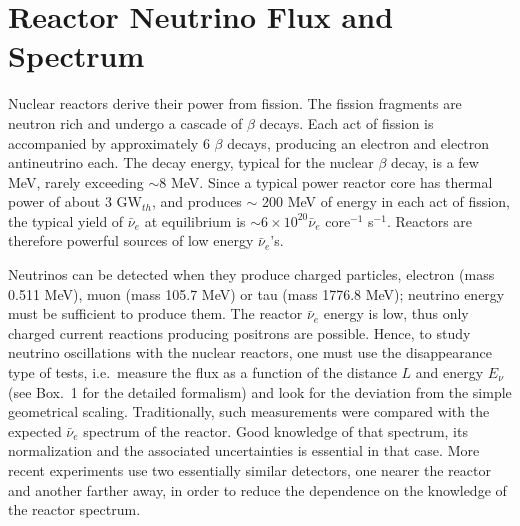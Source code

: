 \documentclass[aps,twocolumn,preprintnumbers,amsmath,superscriptaddress,amssymb,floats,nofootinbib]{revtex4-1}
\begin{document}
\section{Reactor Neutrino Flux and Spectrum} 
\label{sec:flux}

Nuclear reactors derive their power from fission. The fission fragments are neutron rich and undergo a cascade of $\beta$ decays. Each act of fission
is accompanied by approximately 6 $\beta$ decays, producing an electron and electron antineutrino each. The decay energy, typical for the nuclear
$\beta$ decay, is a few MeV, rarely exceeding $\sim$8 MeV. Since a typical power reactor core has thermal power of about 3 GW$_{th}$, and produces
$\sim$ 200 MeV of energy in each act of fission, the typical yield of $\bar{\nu}_e$ at equilibrium is $\sim 6 \times 10^{20} \bar{\nu}_e$ core$^{-1}$ s$^{-1}$.   
Reactors are therefore powerful sources of low energy $\bar{\nu}_e$'s.

Neutrinos can be detected when they produce charged particles, electron (mass 0.511 MeV),
muon (mass 105.7 MeV) or tau (mass 1776.8 MeV); neutrino energy must be sufficient to
produce them. The reactor $\bar{\nu}_e$ energy is low, thus only charged current reactions producing positrons are possible. Hence, to study neutrino oscillations with
the nuclear reactors, one must use the disappearance type of tests, i.e.~measure the flux as a function of the distance $L$ and energy $E_{\nu}$ (see Box.~1 for the detailed formalism) and
look for the deviation from the simple geometrical scaling. Traditionally, such measurements were compared with the expected  $\bar{\nu}_e$ spectrum
of the reactor. Good knowledge of that spectrum, its normalization and the associated uncertainties is essential in that case.  More recent experiments
\cite{Dayabay,Reno} use two essentially similar detectors, one nearer the reactor and another farther away, in order to reduce the dependence on the
knowledge of the reactor spectrum.
\end{document}
